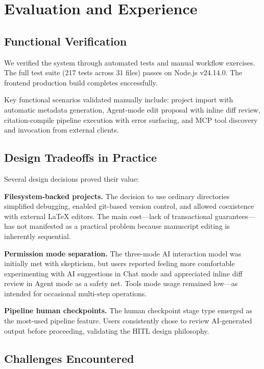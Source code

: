 \documentclass[11pt,a4paper]{article}
\begin{document}
\section{Evaluation and Experience}

\subsection{Functional Verification}

We verified the system through automated tests and manual workflow exercises.
The full test suite (217 tests across 31 files) passes on Node.js v24.14.0.
The frontend production build completes successfully.

Key functional scenarios validated manually include: project import with
automatic metadata generation, Agent-mode edit proposal with inline diff
review, citation-compile pipeline execution with error surfacing, and MCP
tool discovery and invocation from external clients.

\subsection{Design Tradeoffs in Practice}

Several design decisions proved their value:

\textbf{Filesystem-backed projects.} The decision to use ordinary directories
simplified debugging, enabled git-based version control, and allowed
coexistence with external \LaTeX{} editors. The main cost---lack of
transactional guarantees---has not manifested as a practical problem because
manuscript editing is inherently sequential.

\textbf{Permission mode separation.} The three-mode AI interaction model was
initially met with skepticism, but users reported feeling more comfortable
experimenting with AI suggestions in Chat mode and appreciated inline diff
review in Agent mode as a safety net. Tools mode usage remained low---as
intended for occasional multi-step operations.

\textbf{Pipeline human checkpoints.} The human checkpoint stage type emerged as
the most-used pipeline feature. Users consistently chose to review AI-generated
output before proceeding, validating the HITL design philosophy.

\subsection{Challenges Encountered}
\end{document}
